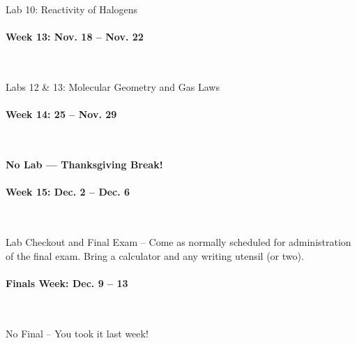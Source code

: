 \documentclass[12pt, letterpaper]{article}
\begin{document}
Lab 10: Reactivity of Halogens

\paragraph{Week 13: Nov. 18 -- Nov. 22}~

Labs 12 \& 13: Molecular Geometry and Gas Laws

\paragraph{Week 14: 25 -- Nov. 29}~

\textbf{No Lab --- Thanksgiving Break!}

\paragraph{Week 15: Dec. 2 -- Dec. 6}~

Lab Checkout and Final Exam -- Come as normally scheduled for administration of the final exam. Bring a calculator and any writing utensil (or two).

\paragraph{Finals Week: Dec. 9 -- 13}~

No Final -- You took it last week!
\end{document}

